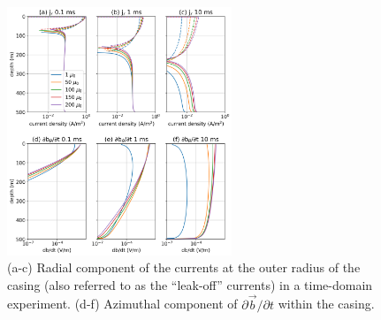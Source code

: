 \begin{figure}
    \begin{center}
    \includegraphics[width=0.6\textwidth]{figures/permeability-contributions.png}
    \end{center}
\caption{
    (a-c) Radial component of the currents at the outer radius of the casing (also referred to as the ``leak-off'' currents) in a time-domain experiment.
    (d-f) Azimuthal component of $\partial \vec{b}/\partial t$ within the casing.
}
\label{fig:permeability-contributions}
\end{figure}



